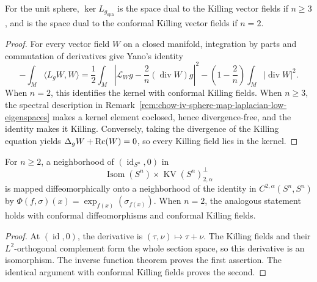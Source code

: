 \begin{lemma}
\label{lem:chow-iv-sphere-map-laplacian-kernel}
For the unit sphere, \(\ker L_{g_{\mathrm{sph}}}\) is the space dual to the
Killing vector fields if \(n\ge3\), and is the space dual to the conformal
Killing vector fields if \(n=2\).
\end{lemma}
\begin{proof}
For every vector field \(W\) on a closed manifold, integration by parts and
commutation of derivatives give Yano's identity
\[
 -\int_M\langle L_gW,W\rangle
 =\frac12\int_M\left|\mathcal L_Wg-\frac2n(\operatorname{div}W)g\right|^2
  -\left(1-\frac2n\right)\int_M|\operatorname{div}W|^2.
\]
When \(n=2\), this identifies the kernel with conformal Killing fields.  When
\(n\ge3\), the spectral description in Remark~\ref{rem:chow-iv-sphere-map-laplacian-low-eigenspaces}
makes a kernel element coclosed, hence divergence-free, and the identity makes
it Killing.  Conversely, taking the divergence of the Killing equation yields
\(\Delta_gW+\operatorname{Rc}(W)=0\), so every Killing field lies in the kernel.
\end{proof}

\begin{lemma}
\label{lem:chow-iv-sphere-maps-near-identity-parametrization}
For \(n\ge2\), a neighborhood of \((\operatorname{id}_{S^n},0)\) in
\[
 \operatorname{Isom}(S^n)\times\operatorname{KV}(S^n)_{2,\alpha}^{\perp}
\]
is mapped diffeomorphically onto a neighborhood of the identity in
\(C^{2,\alpha}(S^n,S^n)\) by
\(\Phi(f,\sigma)(x)=\exp_{f(x)}(\sigma_{f(x)})\).  When \(n=2\), the analogous
statement holds with conformal diffeomorphisms and conformal Killing fields.
\end{lemma}
\begin{proof}
At \((\operatorname{id},0)\), the derivative is
\((\tau,\nu)\mapsto\tau+\nu\).  The Killing fields and their \(L^2\)-orthogonal
complement form the whole section space, so this derivative is an isomorphism.
The inverse function theorem proves the first assertion.  The identical
argument with conformal Killing fields proves the second.
\end{proof}

